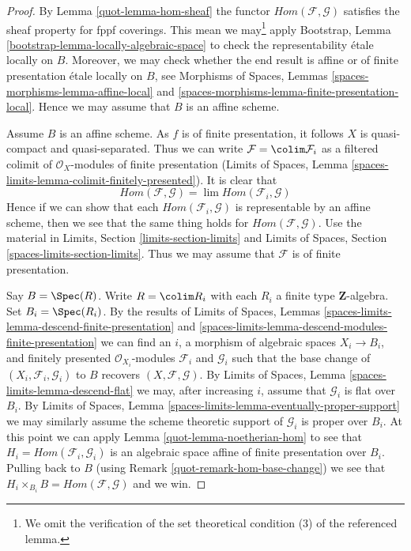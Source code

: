 \begin{proof}

By Lemma \ref{quot-lemma-hom-sheaf} the functor
$\mathit{Hom}(\mathcal{F}, \mathcal{G})$ satisfies
the sheaf property for fppf coverings. This mean we may\footnote{We omit
the verification of the set theoretical condition (3) of the referenced
lemma.} apply
Bootstrap, Lemma \ref{bootstrap-lemma-locally-algebraic-space}
to check the representability \'etale locally on $B$. Moreover,
we may check whether the end result is affine or
of finite presentation \'etale locally on $B$, see
Morphisms of Spaces, Lemmas \ref{spaces-morphisms-lemma-affine-local} and
\ref{spaces-morphisms-lemma-finite-presentation-local}.
Hence we may assume that $B$ is an affine scheme.

\medskip\noindent
Assume $B$ is an affine scheme. As $f$ is of finite presentation, it follows
$X$ is quasi-compact and quasi-separated. Thus we can write
$\mathcal{F} = \colim \mathcal{F}_i$ as a filtered colimit of
$\mathcal{O}_X$-modules of finite presentation
(Limits of Spaces, Lemma \ref{spaces-limits-lemma-colimit-finitely-presented}).
It is clear that
$$
\mathit{Hom}(\mathcal{F}, \mathcal{G}) =
\lim \mathit{Hom}(\mathcal{F}_i, \mathcal{G})
$$
Hence if we can show that each $\mathit{Hom}(\mathcal{F}_i, \mathcal{G})$
is representable by an affine scheme, then we see that the same thing
holds for $\mathit{Hom}(\mathcal{F}, \mathcal{G})$. Use the material in
Limits, Section \ref{limits-section-limits} and
Limits of Spaces, Section \ref{spaces-limits-section-limits}.
Thus we may assume that $\mathcal{F}$ is of finite presentation.

\medskip\noindent
Say $B = \Spec(R)$. Write $R = \colim R_i$ with each $R_i$ a finite
type $\mathbf{Z}$-algebra. Set $B_i = \Spec(R_i)$. By the results of
Limits of Spaces, Lemmas
\ref{spaces-limits-lemma-descend-finite-presentation} and
\ref{spaces-limits-lemma-descend-modules-finite-presentation}
we can find an $i$, a morphism of algebraic spaces $X_i \to B_i$,
and finitely presented $\mathcal{O}_{X_i}$-modules $\mathcal{F}_i$ and
$\mathcal{G}_i$ such that the base change of
$(X_i, \mathcal{F}_i, \mathcal{G}_i)$ to $B$ recovers
$(X, \mathcal{F}, \mathcal{G})$. By
Limits of Spaces, Lemma \ref{spaces-limits-lemma-descend-flat}
we may, after increasing $i$, assume that $\mathcal{G}_i$
is flat over $B_i$. By
Limits of Spaces, Lemma \ref{spaces-limits-lemma-eventually-proper-support}
we may similarly assume the scheme theoretic support of $\mathcal{G}_i$
is proper over $B_i$. At this point we can apply
Lemma \ref{quot-lemma-noetherian-hom}
to see that $H_i = \mathit{Hom}(\mathcal{F}_i, \mathcal{G}_i)$ is
an algebraic space affine of finite presentation over $B_i$.
Pulling back to $B$ (using Remark \ref{quot-remark-hom-base-change})
we see that $H_i \times_{B_i} B = \mathit{Hom}(\mathcal{F}, \mathcal{G})$
and we win.
\end{proof}


